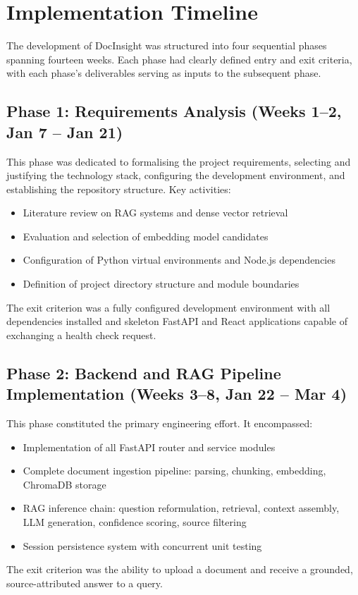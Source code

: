 \section{Implementation Timeline}

The development of DocInsight was structured into four sequential phases spanning fourteen weeks. Each phase had clearly defined entry and exit criteria, with each phase's deliverables serving as inputs to the subsequent phase.

\subsection{Phase 1: Requirements Analysis (Weeks 1--2, Jan 7 -- Jan 21)}

This phase was dedicated to formalising the project requirements, selecting and justifying the technology stack, configuring the development environment, and establishing the repository structure. Key activities:
\begin{itemize}
\item Literature review on RAG systems and dense vector retrieval
\item Evaluation and selection of embedding model candidates
\item Configuration of Python virtual environments and Node.js dependencies
\item Definition of project directory structure and module boundaries
\end{itemize}
The exit criterion was a fully configured development environment with all dependencies installed and skeleton FastAPI and React applications capable of exchanging a health check request.

\subsection{Phase 2: Backend and RAG Pipeline Implementation (Weeks 3--8, Jan 22 -- Mar 4)}

This phase constituted the primary engineering effort. It encompassed:
\begin{itemize}
\item Implementation of all FastAPI router and service modules
\item Complete document ingestion pipeline: parsing, chunking, embedding, ChromaDB storage
\item RAG inference chain: question reformulation, retrieval, context assembly, LLM generation, confidence scoring, source filtering
\item Session persistence system with concurrent unit testing
\end{itemize}
The exit criterion was the ability to upload a document and receive a grounded, source-attributed answer to a query.

